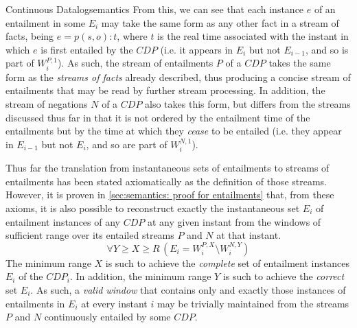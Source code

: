 \begin{nestedsection}{Continuous Datalog}{semantics}
	From this, we can see that each instance $e$ of an entailment in some $E_{i}$ may take the same form as any other fact in a stream of facts, being ${e = p(s,o):t}$, where $t$ is the real time associated with the instant in which $e$ is first entailed by the ${CDP}$ (i.e. it appears in $E_{i}$ but not $E_{i-1}$, and so is part of $W^{P,1}_{i}$).
	As such, the stream of entailments $P$ of a ${CDP}$ takes the same form as the \emph{streams of facts} already described, thus producing a concise stream of entailments that may be read by further stream processing.
	In addition, the stream of negations $N$ of a ${CDP}$ also takes this form, but differs from the streams discussed thus far in that it is not ordered by the entailment time of the entailments but by the time at which they \emph{cease} to be entailed (i.e. they appear in $E_{i-1}$ but not $E_{i}$, and so are part of $W^{N,1}_{i}$).

	Thus far the translation from instantaneous sets of entailments to streams of entailments has been stated axiomatically as the definition of those streams.
	However, it is proven in \ref{sec:semantics: proof for entailments} that, from these axioms, it is also possible to reconstruct exactly the instantaneous set $E_{i}$ of entailment instances of any ${CDP}$ at any given instant from the windows of sufficient range over its entailed streams $P$ and $N$ at that instant.
	\[ \forall Y \geq X \geq R \, \left( E_{i} = W^{P,X}_{i} \setminus W^{N,Y}_{i} \right) \]
	The minimum range $X$ is such to achieve the \emph{complete} set of entailment instances $E_{i}$ of the ${CDP}_{i}$.
	In addition, the minimum range $Y$ is such to achieve the \emph{correct} set $E_{i}$.
	As such, a \emph{valid window} that contains only and exactly those instances of entailments in $E_{i}$ at every instant $i$ may be trivially maintained from the streams $P$ and $N$ continuously entailed by some ${CDP}$.
\end{nestedsection}